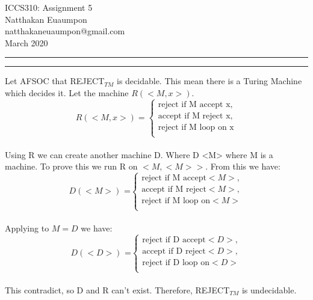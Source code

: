 \documentclass[a4paper, 11pt]{article}
\makeatletter
\newcommand{\question}[2] {\vspace{.25in} \hrule\vspace{0.5em}
\noindent{\bf #1: #2} \vspace{0.5em}
\hrule \vspace{.10in}}
\newcommand{\myname}{Natthakan Euaumpon}
\newcommand{\myemail}{natthakaneuaumpon@gmail.com}
\newcommand{\myhwnum}{5}
\makeatother
\begin{document}
\medskip                        %

\thispagestyle{plain}
\begin{center}                  %
{\Large ICCS310: Assignment \myhwnum} \\
\myname \\
\myemail \\
March 2020 \\
\end{center}

\question{1}{Reject TM}
Let AFSOC that REJECT$_{TM}$ is decidable. This mean there is a Turing Machine which decides it. Let the machine $R(<M,x>)$.\\
\[
\text{$R(<M,x>) =$}
\left\{
\begin{matrix}
\text{reject if M accept x},\\ \text{accept if M reject x},\\ \text{reject if M loop on x}\\
\end{matrix}
\right.
\]\\
Using R we can create another machine D. Where D <M> where M is a machine. To prove this we run R on $<M,<M>>$. From this we have:\\
\[
\text{$D(<M>)$ =}
\left\{
\begin{matrix}
\text{reject if M accept} <M>,\\ \text{accept if M reject} <M>,\\ \text{reject if M loop on} <M>\\
\end{matrix}
\right.
\]\\
Applying to $M=D$ we have:\\
\[
\text{$D(<D>)$ =}
\left\{
\begin{matrix}
\text{reject if D accept} <D>,\\ \text{accept if D reject} <D>,\\ \text{reject if D loop on} <D>\\
\end{matrix}
\right.
\]\\
This contradict, so D and R can't exist. Therefore, REJECT$_{TM}$ is undecidable.
\end{document}
